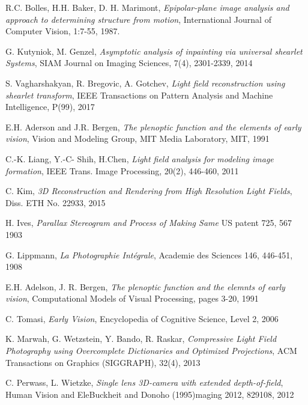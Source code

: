 \documentclass[11pt, english, singlespacing, headsepline, ]{MastersDoctoralThesis}
\theoremstyle{definition}
\begin{document}
\begin{thebibliography}{90}

	R.C. Bolles, H.H. Baker, D. H. Marimont,
  \emph{Epipolar-plane image analysis and approach to determining structure from motion},
  International Journal of Computer Vision, 1:7-55,
  1987.

	G. Kutyniok, M. Genzel,
	\emph{Asymptotic analysis of inpainting via universal shearlet Systems},
	SIAM Journal on Imaging Sciences, 7(4), 2301-2339,
	2014

	S. Vagharshakyan, R. Bregovic, A. Gotchev,
	\emph{Light field reconstruction using shearlet transform},
	IEEE Transactions on Pattern Analysis and Machine Intelligence, P(99),
	2017

	E.H. Aderson and J.R. Bergen,
	\emph{The plenoptic function and the elements of early vision},
	Vision and Modeling Group, MIT Media Laboratory, MIT, 1991 

	C.-K. Liang, Y.-C- Shih, H.Chen,
	\emph{Light field analysis for modeling image formation},
	IEEE Trans. Image Processing, 20(2), 446-460, 
2011

	C. Kim,
  \emph{3D Reconstruction and Rendering from High Resolution Light Fields},
	Diss. ETH No. 22933, 
	2015
  
	H. Ives, 
	\emph{Parallax Stereogram and Process of Making Same}
	US patent 725, 567
	1903

	G. Lippmann, 
	\emph{La Photographie Int\'egrale},
	Academie des Sciences 146, 446-451,
  1908

	E.H. Adelson, J. R. Bergen,
	\emph{The plenoptic function and the elemnts of early vision},
	Computational Models of Visual Processing, pages 3-20,
	1991

	C. Tomasi,
	\emph{Early Vision},
	Encyclopedia of Cognitive Science, Level 2, 
   2006

	K. Marwah, G. Wetzstein, Y. Bando, R. Raskar,
	\emph{Compressive Light Field Photography using Overcomplete Dictionaries and Optimized Projections},
	ACM Transactions on Graphics (SIGGRAPH), 32(4), 
	2013

	C. Perwass, L. Wietzke,
	\emph{Single lens 3D-camera with extended depth-of-field},
	Human Vision and EleBuckheit and Donoho (1995)maging 2012, 829108,
	2012


\end{thebibliography}
\end{document}
